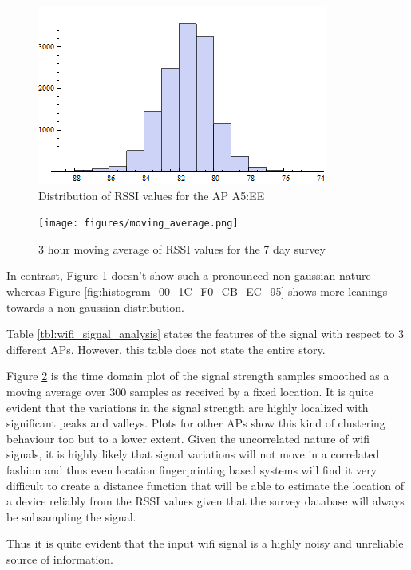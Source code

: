 \begin{figure}\centering
    \includegraphics{figures/histogram_00_19_5B_77_A5_EE.png}
    \caption{Distribution of RSSI values for the AP A5:EE\label{fig:histogram_00_19_5B_77_A5_EE}}
\end{figure}


\begin{figure}\centering
    \texttt{[image: figures/moving\_average.png]}
    \caption{3 hour moving average of RSSI values for the 7 day survey\label{fig:moving_average}}
\end{figure}

In contrast, Figure \ref{fig:histogram_00_19_5B_77_A5_EE} doesn't show such a 
pronounced non-gaussian nature whereas 
Figure \ref{fig:histogram_00_1C_F0_CB_EC_95} shows more leanings towards a
non-gaussian distribution.

Table \ref{tbl:wifi_signal_analysis} states the features of the signal with 
respect to 3 different APs. However, this table does not state the entire 
story. 

Figure \ref{fig:moving_average} is the time domain plot of the signal strength
samples smoothed as a moving average over 300 samples as received by a fixed 
location. It is quite evident that the variations in the signal strength 
are highly localized with significant peaks and valleys. Plots for other APs
show this kind of clustering behaviour too but to a lower extent. 
Given the uncorrelated nature of wifi signals, it is highly likely that 
signal variations will not move in a correlated fashion and thus even 
location fingerprinting based systems will find it very difficult to 
create a distance function that will be able to estimate the location of a
device reliably from the RSSI values given that the survey database will 
always be subsampling the signal. 

Thus it is quite evident that the input wifi signal is a highly noisy and
unreliable source of information.


